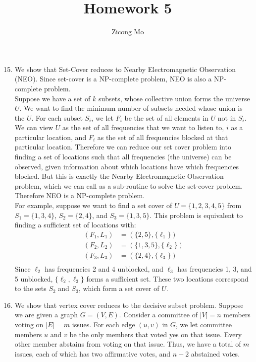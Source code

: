 \documentclass[oneside, 12pt]{article}
\begin{document}
\title{Homework 5}
\author{Zicong Mo}
\maketitle

\begin{enumerate}
\setcounter{enumi}{14}
\item 
We show that Set-Cover reduces to Nearby Electromagnetic Observation (NEO). Since set-cover is a NP-complete problem, NEO is also a NP-complete problem. \\

Suppose we have a set of $k$ subsets, whose collective union forms the universe $U$. We want to find the minimum number of subsets needed whose union is the $U$. For each subset $S_i$, we let $F_i$ be the set of all elements in $U$ not in $S_i$. We can view $U$ as the set of all frequencies that we want to listen to, $i$ as a particular location, and $F_i$ as the set of all frequencies blocked at that particular location. Therefore we can reduce our set cover problem into finding a set of locations such that all frequencies (the universe) can be observed, given information about which locations have which frequencies blocked. But this is exactly the Nearby Electromagnetic Observation problem, which we can call as a sub-routine to solve the set-cover problem. Therefore NEO is a NP-complete problem. \\

For example, suppose we want to find a set cover of $U = \{1, 2, 3, 4, 5\}$ from $S_1 = \{1, 3, 4\}$,  $S_2 = \{2, 4\}$,  and $S_3 = \{1, 3, 5\}$. This problem is equivalent to finding a sufficient set of locations with:
\begin{equation*}
\begin{split}
(F_1, L_1) &= (\{2, 5\}, \{\ell_1\})\\
(F_2, L_2) &= (\{1, 3, 5\}, \{\ell_2\})\\
(F_3, L_3) &= (\{2, 4\}, \{\ell_3\})\\
\end{split}
\end{equation*}
Since $\ell_2$ has frequencies 2 and 4 unblocked, and $\ell_3$ has frequencies 1, 3, and 5 unblocked, $\{\ell_2, \ell_3\}$ forms a sufficient set. These two locations correspond to the sets $S_2$ and $S_3$, which form a set cover of $U$. 
\clearpage
\setcounter{enumi}{17}
\item
We show that vertex cover reduces to the decisive subset problem. Suppose we are given a graph $G = (V, E)$. Consider a committee of $|V| = n$ members voting on $|E| = m$ issues. For each edge $(u, v)$ in $G$, we let committee members $u$ and $v$ be the only members that voted yes on that issue. Every other member abstains from voting on that issue. Thus, we have a total of $m$ issues, each of which has two affirmative votes, and $n - 2$ abstained votes.


\end{enumerate}
\end{document}
